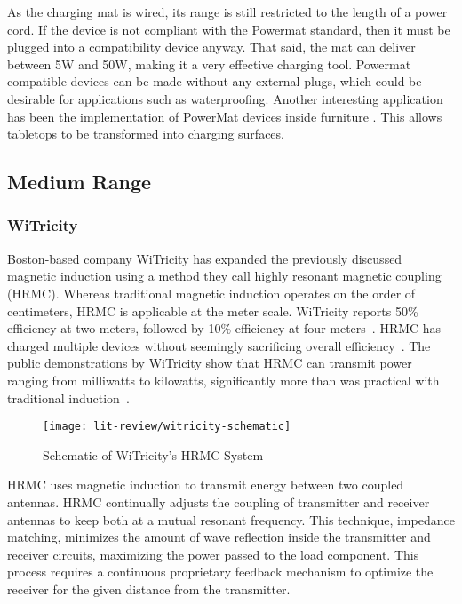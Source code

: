 As the charging mat is wired, its range is still restricted to the length of a power cord. If the device is not compliant with the Powermat standard, then it must be plugged into a compatibility device anyway. That said, the mat can deliver between 5W and 50W, making it a very effective charging tool. Powermat compatible devices can be made without any external plugs, which could be desirable for applications such as waterproofing. Another interesting application has been the implementation of PowerMat devices inside furniture \cite{rogercheng205}. This allows tabletops to be transformed into charging surfaces.

\subsection{Medium Range}

\subsubsection{WiTricity}
Boston-based company WiTricity has expanded the previously discussed magnetic induction using a method they call highly resonant magnetic coupling (HRMC). Whereas traditional magnetic induction operates on the order of centimeters, HRMC is applicable at the meter scale. WiTricity reports 50\% efficiency at two meters, followed by 10\% efficiency at four meters~\cite{kesler_highly_2013,tucker_contribution_2013}. HRMC has charged multiple devices without seemingly sacrificing overall efficiency~\cite{kesler_highly_2013}. The public demonstrations by WiTricity show that HRMC can transmit power ranging from milliwatts to kilowatts, significantly more than was practical with traditional induction~\cite{kesler_highly_2013}.

\begin{figure}[t]
\centering
\texttt{[image: lit-review/witricity-schematic]}
    \caption[WiTricity schematic]{Schematic of WiTricity's HRMC System~\cite{kesler_highly_2013}}
    \label{fig:lit-review-witricity-schematic}
\end{figure}

HRMC uses magnetic induction to transmit energy between two coupled antennas. HRMC continually adjusts the coupling of transmitter and receiver antennas to keep both at a mutual resonant frequency. This technique, impedance matching, minimizes the amount of wave reflection inside the transmitter and receiver circuits, maximizing the power passed to the load component. This process requires a continuous proprietary feedback mechanism to optimize the receiver for the given distance from the transmitter.

